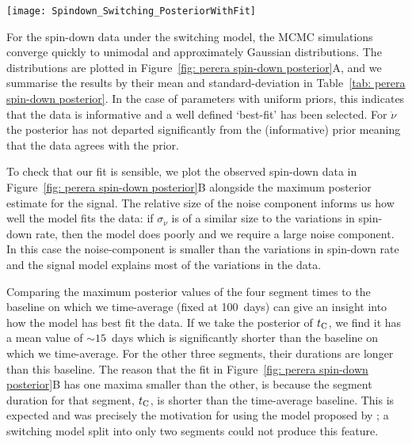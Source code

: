 \documentclass[../full_thesis/full_thesis.tex]{subfiles}
\newcommand{\thisdir}{../comparing_periodic_modulations}
\newcommand{\bigfigurecaptions}[2]{
$\textbf{A}$: The estimated marginal posterior probability distribution for the
#1 #2 model parameters. $\textbf{B}$: Checking the fit of the model using the
maximum posterior values to the data; see Figure~\ref{fig: noise-only beam-width
posterior fit} for a complete description.}
\begin{document}
\begin{figure*}
\centering
\texttt{[image: Spindown\_Switching\_PosteriorWithFit]}
\caption{\bigfigurecaptions{Switching}{spin-down}}
\label{fig: perera spin-down posterior}
\end{figure*}

For the spin-down data under the switching model, the MCMC simulations converge
quickly to unimodal and approximately Gaussian distributions. The distributions are plotted
in Figure~\ref{fig: perera spin-down posterior}A, and we summarise the results by
their mean and standard-deviation in Table~\ref{tab: perera spin-down
posterior}. In the case of parameters with uniform priors, this indicates that the data
is informative and a well defined `best-fit' has been selected. For $\ddot{\nu}$
the posterior has not departed significantly from the (informative) prior meaning that the
data agrees with the prior.
\begin{table}[htb]
\small
\centering
\caption{Posterior estimates for the spin-down switching model.}
\label{tab: perera spin-down posterior}

\end{table}

To check that our fit is sensible, we plot the observed spin-down data in
Figure~\ref{fig: perera spin-down posterior}B alongside the maximum posterior
estimate for the signal. The relative size of the noise component informs us
how well the model fits the data: if $\sigma_{\dot{\nu}}$ is of a similar size
to the variations in spin-down rate, then the model does poorly and we require
a large noise component. In this case the noise-component is smaller than the
variations in spin-down rate and the signal model explains most of the
variations in the data.

Comparing the maximum posterior values of the four segment times to the
baseline on which we time-average (fixed at 100~days) can give an insight into how the
model has best fit the data. If we take the posterior of $t_{\mathrm{C}}$, we find it
has a mean value of $\sim 15$~days which is significantly shorter than the
baseline on which we time-average. For the other three segments, their durations are
longer than this baseline. The reason that the fit in Figure~\ref{fig: perera
spin-down posterior}B has one maxima smaller than the other, is because the
segment duration for that segment, $t_{\mathrm{C}}$, is shorter than the time-average
baseline. This is expected and was precisely the motivation for using the model
proposed by \citet{Perera2015}; a switching model split into only two segments
could not produce this feature.
\end{document}
